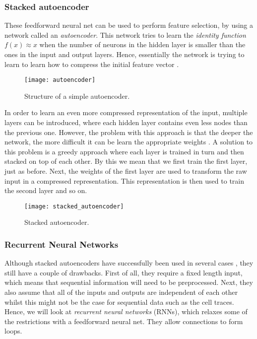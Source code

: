 \subsubsection{Stacked autoencoder}

These feedforward neural net can be used to perform feature selection, by using a network called an \textit{autoencoder}.
This network tries to learn the \textit{identity function} $f(x) \approx x$ when the number of neurons in the hidden layer is smaller than the ones in the input and output layers.
Hence, essentially the network is trying to learn to learn how to compress the initial feature vector \cite{autoencoders}.

\begin{figure}[ht]
  \centering
  \texttt{[image: autoencoder]}
  \caption{Structure of a simple autoencoder.}
  \label{fig:autoencoder}
\end{figure}

In order to learn an even more compressed representation of the input, multiple layers can be introduced, where each hidden layer contains even less nodes than the previous one.
However, the problem with this approach is that the deeper the network, the more difficult it can be learn the appropriate weights \cite{nielsen_2017}.
A solution to this problem is a greedy approach where each layer is trained in turn and then stacked on top of each other.
By this we mean that we first train the first layer, just as before.
Next, the weights of the first layer are used to transform the raw input in a compressed representation.
This representation is then used to train the second layer and so on.

\begin{figure}[ht]
  \centering
  \texttt{[image: stacked\_autoencoder]}
  \caption{Stacked autoencoder.}
  \label{fig:stacked-autoencoder}
\end{figure}

\subsubsection{Recurrent Neural Networks}

Although stacked autoencoders have successfully been used in several cases \cite{deeplearningthesis,deeplearning2}, they still have a couple of drawbacks.
First of all, they require a fixed length input, which means that sequential information will need to be preprocessed.
Next, they also assume that all of the inputs and outputs are independent of each other \cite{britz_2016} whilst this might not be the case for sequential data such as the cell traces.
Hence, we will look at \textit{recurrent neural networks} (RNNs), which relaxes some of the restrictions with a feedforward neural net.
They allow connections to form loops.

